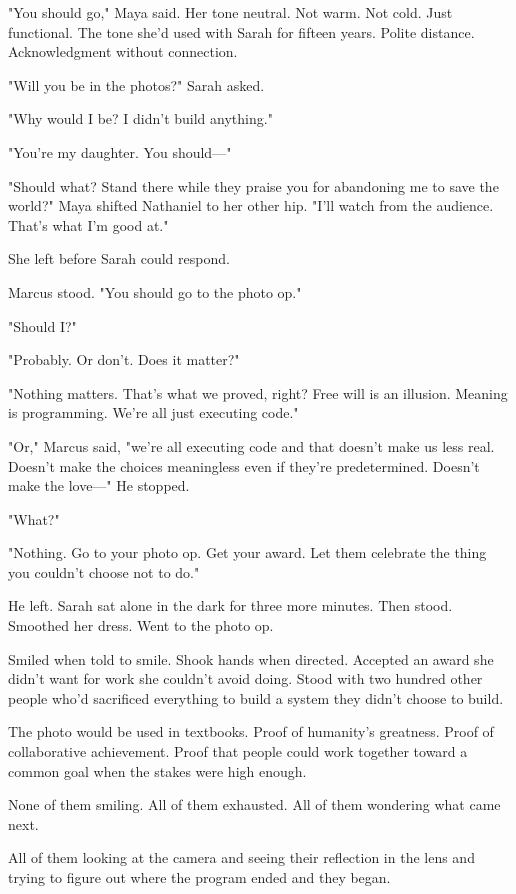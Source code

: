 "You should go," Maya said. Her tone neutral. Not warm. Not cold. Just functional. The tone she'd used with Sarah for fifteen years. Polite distance. Acknowledgment without connection.

"Will you be in the photos?" Sarah asked.

"Why would I be? I didn't build anything."

"You're my daughter. You should—"

"Should what? Stand there while they praise you for abandoning me to save the world?" Maya shifted Nathaniel to her other hip. "I'll watch from the audience. That's what I'm good at."

She left before Sarah could respond.

Marcus stood. "You should go to the photo op."

"Should I?"

"Probably. Or don't. Does it matter?"

"Nothing matters. That's what we proved, right? Free will is an illusion. Meaning is programming. We're all just executing code."

"Or," Marcus said, "we're all executing code and that doesn't make us less real. Doesn't make the choices meaningless even if they're predetermined. Doesn't make the love—" He stopped.

"What?"

"Nothing. Go to your photo op. Get your award. Let them celebrate the thing you couldn't choose not to do."

He left. Sarah sat alone in the dark for three more minutes. Then stood. Smoothed her dress. Went to the photo op.

Smiled when told to smile. Shook hands when directed. Accepted an award she didn't want for work she couldn't avoid doing. Stood with two hundred other people who'd sacrificed everything to build a system they didn't choose to build.

The photo would be used in textbooks. Proof of humanity's greatness. Proof of collaborative achievement. Proof that people could work together toward a common goal when the stakes were high enough.

None of them smiling. All of them exhausted. All of them wondering what came next.

All of them looking at the camera and seeing their reflection in the lens and trying to figure out where the program ended and they began.

\scenebreak


